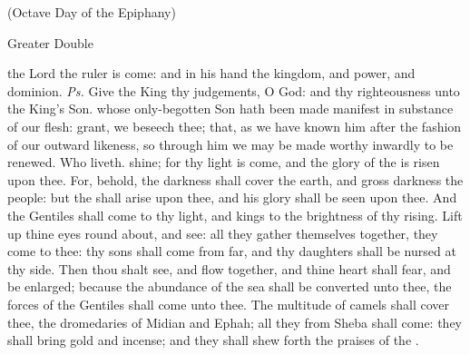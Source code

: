 
\centerline{\small{(Octave Day of the Epiphany)}}

\begin{inhead}
{Greater Double}
\end{inhead}
\par\noindent
{}



\properantiphonfix

\introit
{} the Lord the ruler is come: and in his hand the kingdom, and power, and dominion. \textit{Ps.} Give the King thy judgements, O God: and thy righteousness unto the King's Son.
\collect
{} whose only-begotten Son hath been made manifest in substance of our flesh: grant, we beseech thee; that, as we have known him after the fashion of our outward likeness, so through him we may be made worthy inwardly to be renewed. Who liveth.
 shine; for thy light is come, and the glory of the  is risen upon thee. For, behold, the darkness shall cover the earth, and gross darkness the people: but the  shall arise upon thee, and his glory shall be seen upon thee. And the Gentiles shall come to thy light, and kings to the brightness of thy rising. Lift up thine eyes round about, and see: all they gather themselves together, they come to thee: thy sons shall come from far, and thy daughters shall be nursed at thy side. Then thou shalt see, and flow together, and thine heart shall fear, and be enlarged; because the abundance of the sea shall be converted unto thee, the forces of the Gentiles shall come unto thee. The multitude of camels shall cover thee, the dromedaries of Midian and Ephah; all they from Sheba shall come: they shall bring gold and incense; and they shall shew forth the praises of the .

